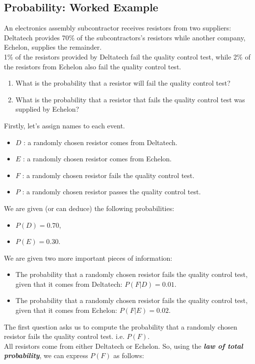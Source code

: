 \documentclass[]{report}
\begin{document}
\subsection{Probability: Worked Example }
An electronics assembly subcontractor receives resistors from two suppliers: Deltatech provides
70\% of the subcontractors's resistors while another company, Echelon, supplies the remainder.
\\
1\% of the resistors provided by Deltatech fail the quality control test, while 2\% of the
resistors from Echelon also fail the quality control test.

\begin{enumerate}
	\item What is the probability that a resistor will fail the quality control test?
	\item What is the probability that a resistor that fails the quality control test was supplied by Echelon?
\end{enumerate}

Firstly, let's assign names to each event.
\begin{itemize}
	\item $D$ : a randomly chosen resistor comes from Deltatech.
	\item $E$ : a randomly chosen resistor comes from Echelon.
	\item $F$ : a randomly chosen resistor fails the quality control test.
	\item $P$ : a randomly chosen resistor passes the quality control test.
\end{itemize}
\bigskip
We are given (or can deduce) the following probabilities:
\begin{itemize}
	\item $P(D) = 0.70$,
	\item $P(E) = 0.30$.
\end{itemize}



We are given two more important pieces of information:
\begin{itemize}
	\item The probability that a randomly chosen resistor fails the quality control test, given that it comes from Deltatech: $P(F|D) = 0.01 $.
	\item The probability that a randomly chosen resistor fails the quality control test, given that it comes from Echelon: $P(F|E) = 0.02$.
\end{itemize}


The first question asks us to compute the probability that a randomly chosen resistor fails the quality control test. i.e. $P(F)$.\\
\bigskip
All resistors come from either Deltatech or Echelon. So, using the \textbf{\emph{law of total probability}}, we can express $P(F)$ as follows:
\end{document}

